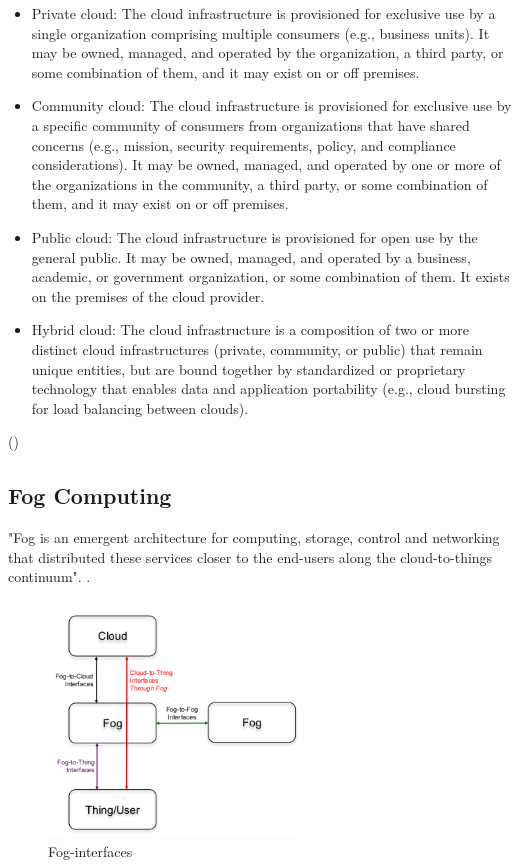 \begin{itemize}
	\item Private cloud: The cloud infrastructure is provisioned for exclusive use by a single organization comprising multiple consumers (e.g., business units). It may be owned, managed, and operated by the organization, a third party, or some combination of them, and it may exist on or off premises.
	\item Community cloud: The cloud infrastructure is provisioned for exclusive use by a specific	community of consumers from organizations that have shared concerns (e.g., mission, security requirements, policy, and compliance considerations). It may be owned, managed, and operated by one or more of the organizations in the community, a third	party, or some combination of them, and it may exist on or off premises.
	\item Public cloud: The cloud infrastructure is provisioned for open use by the general public. It may be owned, managed, and operated by a business, academic, or government organization, or some combination of them. It exists on the premises of the cloud provider.
	\item Hybrid cloud: The cloud infrastructure is a composition of two or more distinct cloud infrastructures (private, community, or public) that remain unique entities, but are bound together by standardized or proprietary technology that enables data and application portability (e.g., cloud bursting for load balancing between clouds).
\end{itemize}
(\cite[see s. 2f]{CloudNIST11})

\newpage
\subsection{Fog Computing}
"Fog is an emergent architecture  for computing, storage, control and networking that distributed these services closer to the end-users along the cloud-to-things continuum". \cite[S. 854]{FogAndIot16}.\\


\begin{figure}
	\centering
	
	\includegraphics[width=0.6\textwidth]{image/fog-and-cloud.png}
	\caption[Fog-interfaces]{Fog-interfaces\footnotemark}
	\label{fog-interfaces}
\end{figure}


